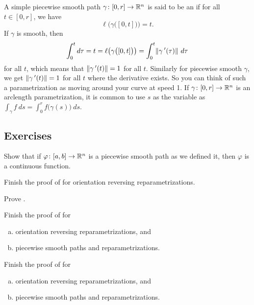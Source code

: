 A simple piecewise smooth path $\gamma \colon [0,r] \to {\mathbb{R}}^n$ is
said to be an \emph{} if
for all $t \in [0,r]$, we have
\begin{equation*}
\ell\bigl( \gamma\bigl([0,t]\bigr) \bigr) = t .
\end{equation*}
If $\gamma$ is smooth, then
\begin{equation*}
\int_0^t d\tau =
t = \ell\bigl( \gamma\bigl([0,t]\bigr) \bigr) =
\int_0^t
\lVert {\gamma^{\:\prime}(\tau)} \rVert
~ d\tau
\end{equation*}
for all $t$,
which means that $\lVert {\gamma^{\:\prime}(t)} \rVert = 1$ for all $t$.
Similarly for piecewise smooth $\gamma$, we get
$\lVert {\gamma^{\:\prime}(t)} \rVert = 1$ for all $t$ where the derivative exists.
So you can think of such a parametrization as moving around your curve at speed
1.  If $\gamma \colon [0,r] \to {\mathbb{R}}^n$ is an arclength parametrization, it is
common to use $s$ as the variable as $\int_\gamma f ~ds
= \int_0^r f\bigl(\gamma(s)\bigr) ~ds$.

\subsection{Exercises}

\begin{exercise}
Show that if $\varphi \colon [a,b] \to {\mathbb{R}}^n$ is a piecewise smooth path as we
defined it, then $\varphi$ is a continuous function.
\end{exercise}

\begin{exercise}
Finish the proof of  for orientation
reversing reparametrizations.
\end{exercise}

\begin{exercise}
Prove .
\end{exercise}

\begin{exercise} \label{mv:exercise:pathpiece}
Finish the proof of 
for
\begin{enumerate}[a)]
\item
orientation reversing reparametrizations, and
\item
piecewise smooth paths
and reparametrizations.
\end{enumerate}
\end{exercise}

\begin{exercise} \label{mv:exercise:linepiece}
Finish the proof of 
for
\begin{enumerate}[a)]
\item
orientation reversing reparametrizations, and
\item
piecewise smooth paths
and reparametrizations.
\end{enumerate}
\end{exercise}

